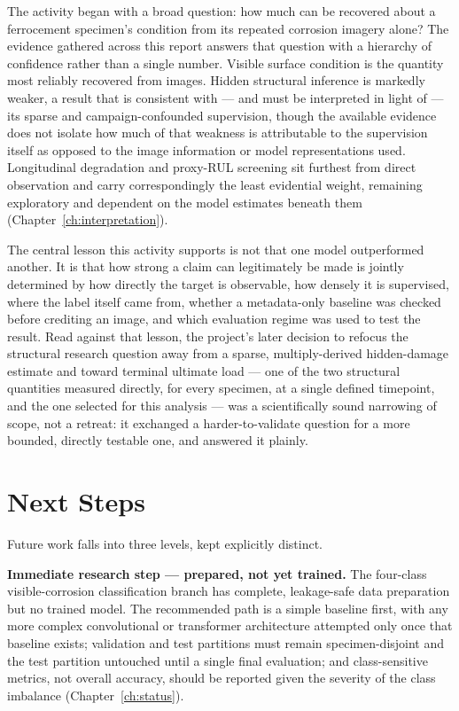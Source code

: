 The activity began with a broad question: how much can be recovered about
a ferrocement specimen's condition from its repeated corrosion imagery
alone? The evidence gathered across this report answers that question with
a hierarchy of confidence rather than a single number. Visible surface
condition is the quantity most reliably recovered from images. Hidden
structural inference is markedly weaker, a result that is consistent
with — and must be interpreted in light of — its sparse and
campaign-confounded supervision, though the available evidence does not
isolate how much of that weakness is attributable to the supervision
itself as opposed to the image information or model representations used.
Longitudinal degradation and proxy-RUL screening sit
furthest from direct observation and carry correspondingly the least
evidential weight, remaining exploratory and dependent on the model
estimates beneath them (Chapter~\ref{ch:interpretation}).

The central lesson this activity supports is not that one model
outperformed another. It is that how strong a claim can legitimately be
made is jointly determined by how directly the target is observable, how
densely it is supervised, where the label itself came from, whether a
metadata-only baseline was checked before crediting an image, and which
evaluation regime was used to test the result. Read against that lesson,
the project's later decision to refocus the structural research question
away from a sparse, multiply-derived hidden-damage estimate and toward
terminal ultimate load — one of the two structural quantities measured
directly, for every specimen, at a single defined timepoint, and the one
selected for this analysis — was a scientifically sound narrowing of
scope, not a retreat: it exchanged a harder-to-validate question for a
more bounded, directly testable one, and answered it plainly.

\section{Next Steps}
\label{sec:conclusions-next}

Future work falls into three levels, kept explicitly distinct.

\textbf{Immediate research step — prepared, not yet trained.} The
four-class visible-corrosion classification branch has complete,
leakage-safe data preparation but no trained model. The recommended path
is a simple baseline first, with any more complex convolutional or
transformer architecture attempted only once that baseline exists;
validation and test partitions must remain specimen-disjoint and the test
partition untouched until a single final evaluation; and class-sensitive
metrics, not overall accuracy, should be reported given the severity of
the class imbalance (Chapter~\ref{ch:status}).

